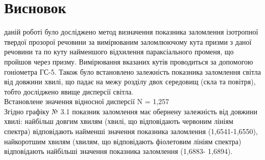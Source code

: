 \section{Висновок}
 даній роботі було досліджено метод визначення показника заломлення ізотропної твердої
прозорої речовини за вимірюваним заломлюючому кута призми з даної речовини та по куту
найменшого відхилення параксіального променя, що пройшов через призму. Вимірювання
вказаних кутів проводиться за допомогою гоніометра ГС-5. Також було встановлено залежність
показника заломлення світла від довжини хвилі, що падає на межу розділу двох середовищ (скла
та повітря), тобто досліджено явище дисперсії світла. \\
Встановлене значення відносної дисперсії N = 1,257 \\
Згідно графіку № 3.1 показник заломлення має обернену залежність від довжини хвилі: найбільш
довгим хвилям (хвилі, що відповідають червоним лініям спектра) відповідають найменші значення
показника заломлення (1,6541-1,6550), найкоротшим хвилям (хвилям, що відповідають
фіолетовим лініям спектра) відповідають найбільші значення показника заломлення (1,6883-
1,6894).
